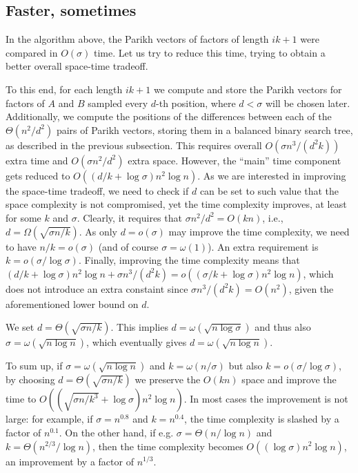 \documentclass{llncs}
\begin{document}
\subsection{Faster, sometimes}
\noindent 
In the algorithm above, the Parikh vectors of factors 
of length $ik+1$ were compared in $O(\sigma)$ time.
Let us try to reduce this time, trying to obtain a better 
overall space-time tradeoff.

To this end, for each length $ik+1$ 
we compute and store the Parikh vectors for 
factors of $A$ and $B$ sampled every $d$-th position, 
where $d < \sigma$ will be chosen later.
Additionally, we compute the positions of the differences between each of the 
$\Theta(n^2/d^2)$ pairs of Parikh vectors, storing them in a 
balanced binary search tree, as described in the previous subsection.
This requires overall $O(\sigma n^3/(d^2 k))$ extra time 
and $O(\sigma n^2/d^2)$ extra space.
However, the ``main'' time component gets reduced to 
$O( (d/k + \log\sigma)n^2 \log n)$.
As we are interested in improving the space-time tradeoff, 
we need to check if $d$ can be set to such value that 
the space complexity is not compromised, yet the time complexity 
improves, at least for some $k$ and $\sigma$.
Clearly, it requires that $\sigma n^2/d^2 = O(kn)$, i.e., 
$d = \Omega(\sqrt{\sigma n/k})$.
As only $d = o(\sigma)$ may improve the time complexity, 
we need to have $n/k = o(\sigma)$ (and of course $\sigma = \omega(1)$).
An extra requirement is $k = o(\sigma/\log\sigma)$.
Finally, improving the time complexity means that 
$(d/k + \log\sigma)n^2 \log n + \sigma n^3/(d^2 k) =
o((\sigma/k + \log\sigma)n^2 \log n)$, which does not introduce 
an extra constaint since $\sigma n^3/(d^2 k) = O(n^2)$, given 
the aforementioned lower bound on $d$.

We set $d = \Theta(\sqrt{\sigma n/k})$.
This implies $d = \omega(\sqrt{n\log\sigma})$ and thus also 
$\sigma = \omega(\sqrt{n\log n})$, which eventually gives 
$d = \omega(\sqrt{n\log n})$.

To sum up, if $\sigma = \omega(\sqrt{n\log n})$ and 
$k = \omega(n / \sigma)$ but also $k = o(\sigma/\log\sigma)$,
by choosing $d = \Theta(\sqrt{\sigma n/k})$
we preserve the $O(kn)$ space and improve the time 
to $O((\sqrt{\sigma n/k^3} + \log\sigma)n^2 \log n)$.
In most cases the improvement is not large: 
for example, if $\sigma = n^{0.8}$ and $k = n^{0.4}$, 
the time complexity is slashed by a factor of $n^{0.1}$.
On the other hand, if e.g. $\sigma = \Theta(n/\log n)$ 
and $k = \Theta(n^{2/3}/\log n)$, then the time complexity 
becomes $O((\log\sigma) n^2 \log n)$, 
an improvement by a factor of $n^{1/3}$.
\end{document}

